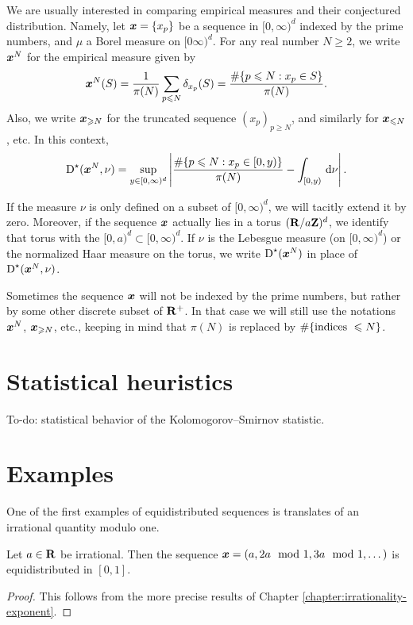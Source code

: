 We are usually interested in comparing empirical measures and their conjectured 
distribution. Namely, let ${\boldsymbol x} = \{x_p\}$ be a sequence in $[0,\infty)^d$ 
indexed by the prime numbers, and $\mu$ a Borel measure on $[0\infty)^d$. For 
any real number $N\geqslant 2$, we write ${\boldsymbol x}^N$ for the empirical measure 
given by 
\[
	{\boldsymbol x}^N(S) = \frac{1}{\pi(N)} \sum_{p\leqslant N} \delta_{x_p}(S) = \frac{\# \{p\leqslant N : x_p\in S\}}{\pi(N)} .
\]
Also, we write ${\boldsymbol x}_{\geqslant N}$ for the truncated sequence 
$(x_p)_{p\geqslant N}$, and similarly for ${\boldsymbol x}_{\leqslant N}$, etc. In this 
context, 
\[
	\operatorname{D}^\star({\boldsymbol x}^N,\nu) = \sup_{y\in [0,\infty)^d} \left| \frac{\# \{p\leqslant N : x_p \in [0,y)\}}{\pi(N)} - \int_{[0,y)} \, \mathrm{d}\nu\right| .
\]

If the measure $\nu$ is only defined on a subset of $[0,\infty)^d$, we will 
tacitly extend it by zero. Moreover, if the sequence ${\boldsymbol x}$ actually lies in a 
torus $(\mathbf{R}/a \mathbf{Z})^d$, we identify that torus with the 
$[0,a)^d\subset [0,\infty)^d$. If $\nu$ is the Lebesgue measure (on 
$[0,\infty)^d$) or the normalized Haar measure on the torus, we write 
$\operatorname{D}^\star({\boldsymbol x}^N)$ in place of $\operatorname{D}^\star({\boldsymbol x}^N, \nu)$. 

Sometimes the sequence ${\boldsymbol x}$ will not be indexed by the prime numbers, but 
rather by some other discrete subset of $\mathbf{R}^+$. In that case we will still 
use the notations ${\boldsymbol x}^N$, ${\boldsymbol x}_{\geqslant N}$, etc., keeping in mind that 
$\pi(N)$ is replaced by $\#\{\textnormal{indices }\leqslant N\}$. 





\section{Statistical heuristics}

To-do: statistical behavior of the Kolomogorov--Smirnov statistic. 





\section{Examples}

One of the first examples of equidistributed sequences is translates of an 
irrational quantity modulo one. 

\begin{theorem}
Let $a\in \mathbf{R}$ be irrational. Then the sequence 
${\boldsymbol x}=(a,2a\mod 1,3a\mod 1,\dots)$ is equidistributed in $[0,1]$. 
\end{theorem}
\begin{proof}
This follows from the more precise results of Chapter 
\ref{chapter:irrationality-exponent}. 
\end{proof}

